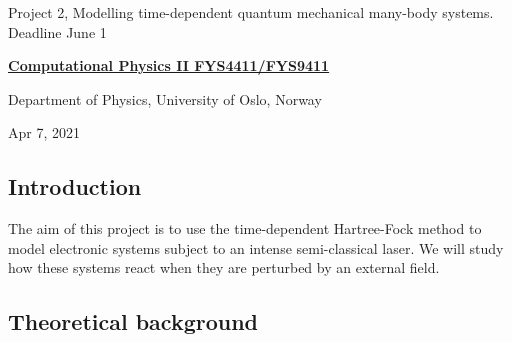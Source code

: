 \documentclass[%
oneside,                 %
final,                   %
10pt]{article}
\begin{document}

\newcommand{\exercisesection}[1]{\subsection*{#1}}






\thispagestyle{empty}

\begin{center}
{\LARGE\bf
\begin{spacing}{1.25}
Project 2, Modelling time-dependent quantum mechanical many-body systems. Deadline June 1
\end{spacing}
}
\end{center}


\begin{center}
{\bf \href{{http://www.uio.no/studier/emner/matnat/fys/FYS4411/index-eng.html}}{Computational Physics II FYS4411/FYS9411}}
\end{center}

    \begin{center}
\centerline{{\small Department of Physics, University of Oslo, Norway}}
\end{center}
    

\begin{center}
Apr 7, 2021
\end{center}

\vspace{1cm}


\subsection*{Introduction}

The aim of this project is to use the time-dependent Hartree-Fock method to
model electronic systems subject to an intense semi-classical laser. We will
study how these systems react when they are perturbed by an external field.


\subsection*{Theoretical background}
\end{document}
